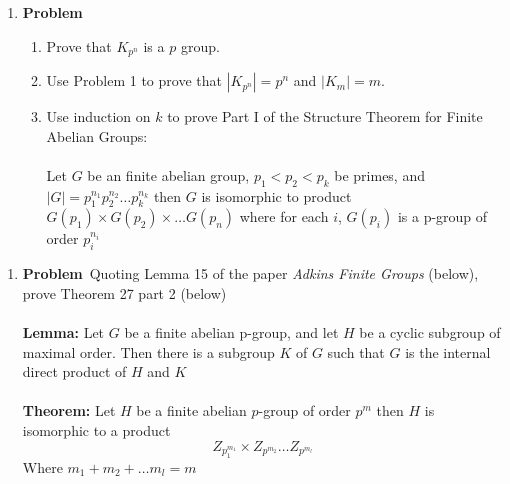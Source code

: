 \documentclass[12pt]{amsart}
\newcommand{\benu}{\begin{enumerate}}
\newcommand{\eenu}{\end{enumerate}}
\theoremstyle{definition}
\newcommand{\itep}{\item {\bfseries Problem}\ }
\begin{document}
\newpage

\begin{enumerate}[resume=p]
\itep
\benu
\item Prove that $K_{p^n}$ is a $p$ group.
\item Use Problem 1 to prove that $|K_{p^n}|=p^n$ and $|K_m|=m$.
\item Use induction on $k$ to prove Part I of the Structure Theorem for Finite Abelian Groups:
\\\\ Let $G$ be an finite abelian group, $p_1<p_2<p_k$ be primes, and $|G|=p_1^{n_1}p_2^{n_2}\dots p_k^{n_k}$ then $G$ is isomorphic to product $G(p_1)\times G(p_2)\times \dots G(p_n)$ where for each $i$, $G(p_i)$ is a p-group of order $p_i^{n_i}$

\eenu
\end{enumerate}


\newpage

\begin{enumerate}[resume=p]
\itep Quoting Lemma 15 of the paper {\em Adkins Finite Groups} (below), prove Theorem 27 part 2 (below)
\\\\
\textbf{Lemma:} Let $G$ be a finite abelian p-group, and let $H$ be a cyclic subgroup of maximal order.  Then there is a subgroup $K$ of $G$ such that $G$ is the internal direct product of $H$ and $K$ 
\\\\
\textbf{Theorem:} Let $H$ be a finite abelian $p$-group of order $p^m$ then $H$ is isomorphic to a product
  \[ Z_{p_1^{m_1}}\times Z_{p^{m_2}}\dots Z_{p^{m_l}}\]
    Where $m_1+m_2+\dots m_l=m$
\end{enumerate}
\end{document}
